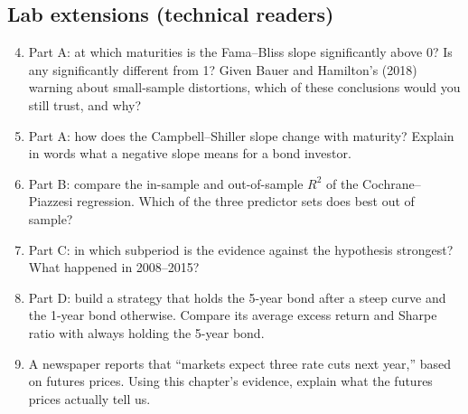 \subsection*{Lab extensions (technical readers)}

\begin{enumerate}
  \setcounter{enumi}{3}
  \item Part A: at which maturities is the Fama--Bliss slope significantly above 0? Is any significantly different from 1? Given Bauer and Hamilton's (2018) warning about small-sample distortions, which of these conclusions would you still trust, and why?
  \item Part A: how does the Campbell--Shiller slope change with maturity? Explain in words what a negative slope means for a bond investor.
  \item Part B: compare the in-sample and out-of-sample $R^2$ of the Cochrane--Piazzesi regression. Which of the three predictor sets does best out of sample?
  \item Part C: in which subperiod is the evidence against the hypothesis strongest? What happened in 2008--2015?
  \item Part D: build a strategy that holds the 5-year bond after a steep curve and the 1-year bond otherwise. Compare its average excess return and Sharpe ratio with always holding the 5-year bond.
  \item A newspaper reports that ``markets expect three rate cuts next year,'' based on futures prices. Using this chapter's evidence, explain what the futures prices actually tell us.
\end{enumerate}
